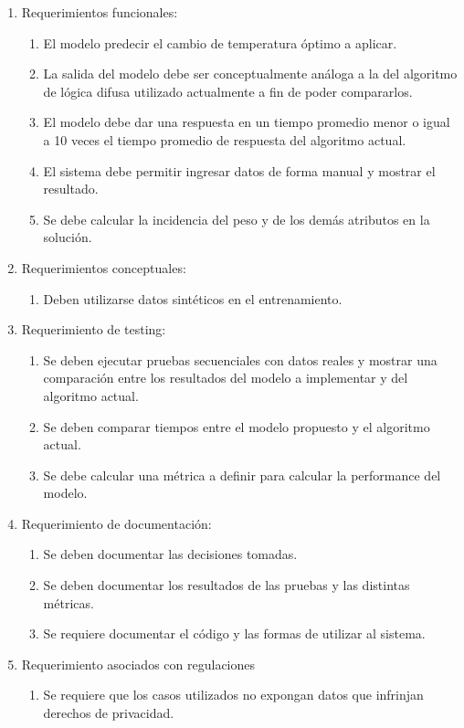 \documentclass[
11pt, %
]{charter}
\begin{document}
\begin{enumerate}
	\item Requerimientos funcionales:
		\begin{enumerate}
			\item El modelo predecir el cambio de temperatura óptimo a aplicar.
			\item La salida del modelo debe ser conceptualmente análoga a la del algoritmo de lógica difusa utilizado actualmente a fin de poder compararlos.
			\item El modelo debe dar una respuesta en un tiempo promedio menor o igual a 10 veces el tiempo promedio de respuesta del algoritmo actual.
			\item El sistema debe permitir ingresar datos de forma manual y mostrar el resultado.
			\item Se debe calcular la incidencia del peso y de los demás atributos en la solución.
		\end{enumerate}
	\item Requerimientos conceptuales:
		\begin{enumerate}
			\item Deben utilizarse datos sintéticos en el entrenamiento.
		\end{enumerate}
	\item Requerimiento de testing:
		\begin{enumerate}
			\item Se deben ejecutar pruebas secuenciales con datos reales y mostrar una comparación entre los resultados del modelo a implementar y del algoritmo actual.
			\item Se deben comparar tiempos entre el modelo propuesto y el algoritmo actual.
			\item Se debe calcular una métrica a definir para calcular la performance del modelo.
		\end{enumerate}
	\item Requerimiento de documentación:
		\begin{enumerate}
			\item Se deben documentar las decisiones tomadas.
			\item Se deben documentar los resultados de las pruebas y las distintas métricas.
			\item Se requiere documentar el código y las formas de utilizar al sistema.
		\end{enumerate}
	\item Requerimiento asociados con regulaciones
		\begin{enumerate}
			\item Se requiere que los casos utilizados no expongan datos que infrinjan derechos de privacidad.
		\end{enumerate}
\end{enumerate}
\end{document}
